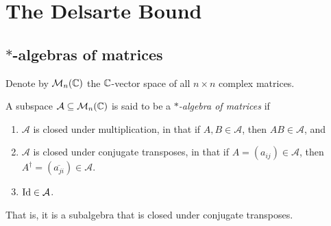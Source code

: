 
\section{The Delsarte Bound}

\subsection{$*$-algebras of matrices}

	Denote by $\mathcal{M}_n(\mathbb{C})$ the $\mathbb{C}$-vector space of all $n \times n$ complex matrices.

	\begin{fdef}
		A subspace $\mathcal{A} \subseteq \mathcal{M}_n(\mathbb{C})$ is said to be a \emph{$*$-algebra of matrices} if
		\begin{enumerate}
			\item $\mathcal{A}$ is closed under multiplication, in that if $A,B \in \mathcal{A}$, then $AB \in \mathcal{A}$, and
			\item $\mathcal{A}$ is closed under conjugate transposes, in that if $A = (a_{ij}) \in \mathcal{A}$, then $A^\dagger = (\overline{a_{ji}}) \in \mathcal{A}$.
			\item $\operatorname{Id} \in \mathcal{A}$.
		\end{enumerate}
	\end{fdef}

	That is, it is a subalgebra that is closed under conjugate transposes.


